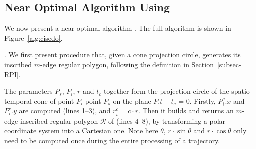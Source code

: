 




\subsection{Near Optimal Algorithm Using \sed}





We now present a near optimal algorithm \cisto. The full algorithm is shown in Figure~\ref{alg:cisedo}.

.
We first present procedure  that, given a cone projection circle, generates its inscribed $m$-edge regular polygon,  following the definition in Section~\ref{subsec-RPI}.

The parameters $P_s$, $P_i$, $r$ and $t_c$ together form the projection circle  of the spatio-temporal cone  of point $P_{i}$ \wrt point $P_s$ on the plane $P.t - t_c$ = $0$. Firstly, $P^c_i.x$ and $P^c_i.y$ are computed (lines 1--3), and $r^c_i = c\cdot r$.
Then it builds and returns an $m$-edge inscribed regular polygon $\mathcal{R}$ of  (lines 4--8), by transforming a polar coordinate system
into a Cartesian one. Note here $\theta$, $r\cdot\sin\theta$ and $r\cdot\cos\theta$ only need to be computed once during the entire processing of a trajectory.


